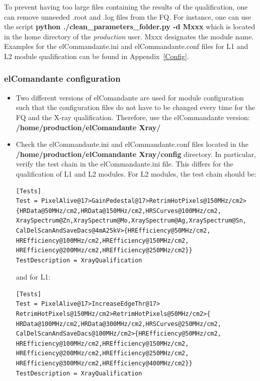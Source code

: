 \documentclass[a4paper,12pt,twoside]{article}
\begin{document}
To prevent having too large files containing the results of the qualification, one can remove unneeded .root and .log files from the FQ. For instance, one can use the script \textbf{python ./clean\_parameters\_folder.py -d Mxxx} which is located in the home directory of the \textit{production} user. Mxxx designates the module name. \\

Examples for the elCommandante.ini and elCommandante.conf files for L1 and L2 module qualification can be found in Appendix~\ref{Config}.

\subsubsection{elComandante configuration}

\begin{itemize}
\item Two different versions of elComandante are used for module configuration such that the configuration files do not have to be changed every time for the FQ and the X-ray qualification. Therefore, use the elCommandante version:  \textbf{/home/production/elComandante{\color{Red} Xray}/}
\item Check the elCommandante.ini and elCommandante.conf files located in the \textbf{/home/production/elComandante{\color{Red} Xray}/config} directory. In particular, verify the test chain in the elCommandante.ini file. This differs for the qualification of L1 and L2 modules. For L2 modules, the test chain should be:

\begin{Verbatim}[frame=single]
[Tests]
Test = PixelAlive@17>GainPedestal@17>RetrimHotPixels@150MHz/cm2>
{HRData@50MHz/cm2,HRData@150MHz/cm2,HRSCurves@100MHz/cm2,
XraySpectrum@Zn,XraySpectrum@Mo,XraySpectrum@Ag,XraySpectrum@Sn,
CalDelScanAndSaveDacs@4mA25kV>{HREfficiency@50MHz/cm2,
HREfficiency@100MHz/cm2,HREfficiency@150MHz/cm2,
HREfficiency@200MHz/cm2,HREfficiency@250MHz/cm2}}
TestDescription = XrayQualification
\end{Verbatim}

and for L1:

\begin{Verbatim}[frame=single]
[Tests]
Test = PixelAlive@17>IncreaseEdgeThr@17>
RetrimHotPixels@150MHz/cm2>RetrimHotPixels@50MHz/cm2>{
HRData@100MHz/cm2,HRData@300MHz/cm2,HRSCurves@250MHz/cm2,
CalDelScanAndSaveDacs@100MHz/cm2>{HREfficiency@50MHz/cm2,
HREfficiency@100MHz/cm2,HREfficiency@150MHz/cm2,
HREfficiency@200MHz/cm2,HREfficiency@250MHz/cm2,
HREfficiency@300MHz/cm2,HREfficiency@400MHz/cm2}}
TestDescription = XrayQualification
\end{Verbatim}


\end{itemize}
\end{document}
